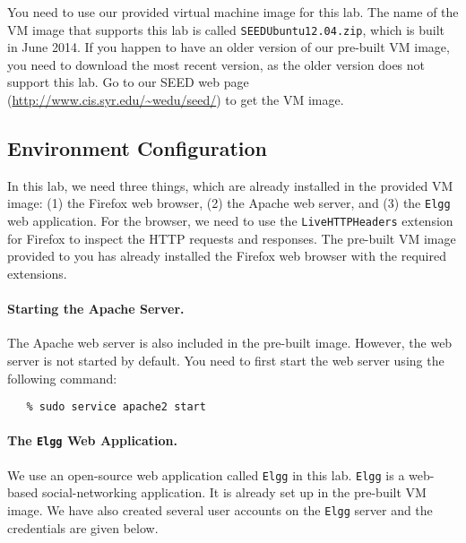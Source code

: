 

You need to use our provided virtual machine image for this lab.
The name of the VM image that supports this lab is called
{\tt SEEDUbuntu12.04.zip}, which is built in June 2014.
If you happen to have an older version of our pre-built VM image,
you need to download the most recent version, as the older version
does not support this lab. Go to our SEED web page
(\url{http://www.cis.syr.edu/~wedu/seed/})
to get the VM image.


\subsection{Environment Configuration}

In this lab, we need three things, which are already 
installed in the provided VM image: (1) the Firefox web browser,
(2) the Apache web server, and (3) the {\tt Elgg} 
web application. For the browser,
we need to use the \texttt{LiveHTTPHeaders} extension for Firefox to
inspect the HTTP requests and responses. The pre-built \ubuntu
VM image provided to you has already installed the Firefox web browser with the
required extensions. 


\paragraph{Starting the Apache Server.}
The Apache web server is also included in the pre-built \ubuntu
image. However, the web server is not started by default.
You need to first start the web server using the
following command:
\begin{verbatim}
   % sudo service apache2 start
\end{verbatim}

\paragraph{The {\tt Elgg} Web Application.}
We use an open-source web application called {\tt Elgg} in this lab.
{\tt Elgg} is a web-based social-networking application. 
It is already set up in the 
pre-built \ubuntu VM image. 
We have also created several user accounts on the {\tt Elgg} server and the credentials are given below.


